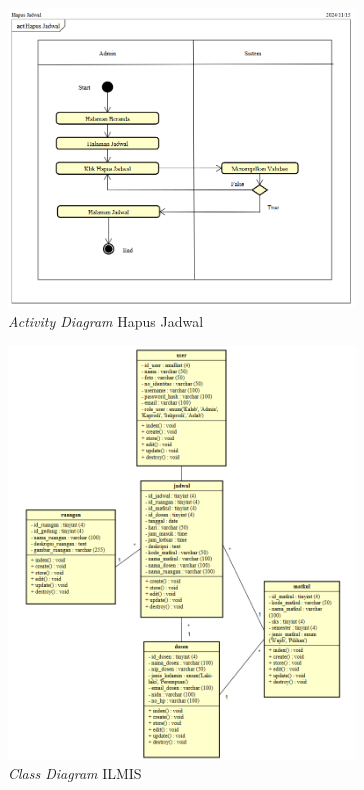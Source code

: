 \begin{figure}
	\centering
	\includegraphics[width=0.82\textwidth]{konten/gambar/activity-diagram/hapus-jadwal.png}
	\caption{\textit{Activity Diagram} Hapus Jadwal}
	\label{activity-diagram-hapus-jadwal}
\end{figure}

\begin{figure}
	\centering
	\includegraphics[width=0.82\textwidth]{konten/gambar/class-diagram.png}
	\caption{\textit{Class Diagram} ILMIS}
	\label{class-diagram}
\end{figure}

